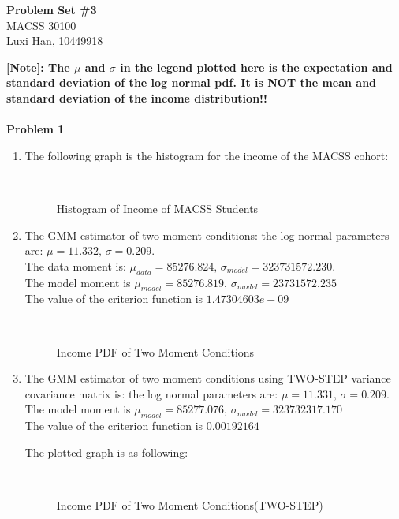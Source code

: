 \documentclass[letterpaper,12pt]{article}
\theoremstyle{definition}
\numberwithin{equation}{section}
\begin{document}
\begin{flushleft}
   \textbf{\Large{Problem Set \#3}} \\
   MACSS 30100 \\
   Luxi Han, 10449918\\
\end{flushleft}

\textbf{[Note]: The \(\mu\) and \(\sigma\) in the legend plotted here is the expectation and standard deviation of the log normal pdf. It is NOT the mean and standard deviation of the income distribution!!}\, \, \\
\, \\

\noindent \textbf{\large Problem 1}\par

\begin{enumerate} [\bfseries (a)]
\item The following graph is the histogram for the income of the MACSS cohort:\\
	\begin{figure}[H]
    		\centering
		\
    		\caption{Histogram of Income of MACSS Students}
	\end{figure}\par
	
\item The GMM estimator of two moment conditions: the log normal parameters are: \(\mu = 11.332, \, \sigma = 0.209\). \\
The data moment is: \(\mu_{data} = 85276.824, \, \sigma_{m odel} = 323731572.230\).\\
The model moment is \(\mu_{model} = 85276.819, \, \sigma_{model} = 23731572.235\)\\
The value of the criterion function is \(1.47304603e-09\)\par
	\begin{figure}[H]
    		\centering
		\fbox{\resizebox{5in}{3in}{\texttt{[image: 1b]}}}\
    		\caption{Income PDF of Two Moment Conditions}
	\end{figure}\par

\item The GMM estimator of two moment conditions using TWO-STEP variance covariance matrix is: the log normal parameters are: \(\mu = 11.331, \, \sigma = 0.209\). \\
The model moment is \(\mu_{model} = 85277.076, \, \sigma_{model} = 323732317.170\)\\
The value of the criterion function is \(0.00192164\)\par
The plotted graph is as following:\\
	\begin{figure}[H]
    		\centering
		\fbox{\resizebox{5in}{3in}{\texttt{[image: 1c]}}}\
    		\caption{Income PDF of Two Moment Conditions(TWO-STEP)}
	\end{figure}\par


\end{enumerate}
\end{document}
